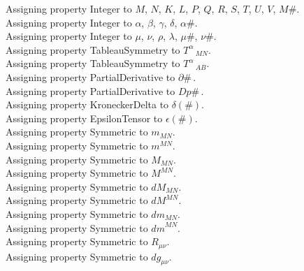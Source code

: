 \documentclass[11pt]{article}
\begin{document}
Assigning property Integer to $M$, $N$, $K$, $L$, $P$, $Q$, $R$, $S$, $T$, $U$, $V$, $M\#$.
\\
Assigning property Integer to $\alpha$, $\beta$, $\gamma$, $\delta$, $\alpha\#$.
\\
Assigning property Integer to $\mu$, $\nu$, $\rho$, $\lambda$, $\mu\#$, $\nu\#$.
\\
Assigning property TableauSymmetry to ${T}^{\alpha}\,_{M N}$.
\\
Assigning property TableauSymmetry to ${T}^{\alpha}\,_{A B}$.
\\
Assigning property PartialDerivative to $\partial{\#}\, $.
\\
Assigning property PartialDerivative to $Dp{\#}\, $.
\\
Assigning property KroneckerDelta to $\delta(\#)$.
\\
Assigning property EpsilonTensor to $\epsilon(\#)$.
\\
Assigning property Symmetric to ${m}_{M N}$.
\\
Assigning property Symmetric to ${m}^{M N}$.
\\
Assigning property Symmetric to ${M}_{M N}$.
\\
Assigning property Symmetric to ${M}^{M N}$.
\\
Assigning property Symmetric to ${dM}_{M N}$.
\\
Assigning property Symmetric to ${dM}^{M N}$.
\\
Assigning property Symmetric to ${dm}_{M N}$.
\\
Assigning property Symmetric to ${dm}^{M N}$.
\\
Assigning property Symmetric to ${R}_{\mu \nu}$.
\\
Assigning property Symmetric to ${dg}_{\mu \nu}$.
\\
\end{document}
